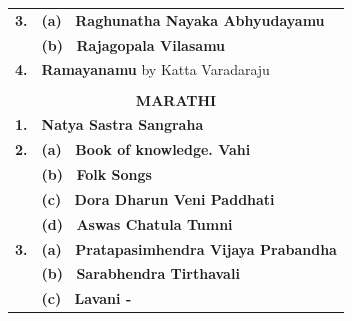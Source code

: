 \documentclass[11pt, openany]{book}
\begin{document}
\begin{table}[h!]
\begin{tabular}{ll}
\textbf{\small 3.}  & {\small \textbf{  (a)~  Raghunatha Nayaka Abhyudayamu}}             \\
\textbf{\small }    & {\small \textbf{  (b)~  Rajagopala Vilasamu}}\\
\textbf{\small 4.}  & {\small \textbf{ Ramayanamu}  by Katta Varadaraju}                \\
&\\
\multicolumn{2}{c}{\textbf{MARATHI}}                                 \\
\textbf{\small 1.}  & {\small \textbf{ Natya Sastra Sangraha}    }                     \\
\textbf{\small 2.}  & {\small \textbf{  (a)~  Book of knowledge. Vahi}  }                  \\
\textbf{\small }    & {\small \textbf{  (b)~  Folk Songs}            }                    \\
\textbf{\small }    & {\small \textbf{  (c)~  Dora Dharun Veni Paddhati}                 }\\
\textbf{\small }    & {\small \textbf{  (d)~  Aswas Chatula Tumni }}\\
\textbf{\small 3.}  & {\small \textbf{  (a)~  Pratapasimhendra Vijaya Prabandha}         }\\
\textbf{\small }    & {\small \textbf{  (b)~  Sarabhendra Tirthavali}                    }\\
\textbf{\small }    & {\small \textbf{  (c)~  Lavani -}}                            
\end{tabular}
\end{table}
\newpage
\end{document}
